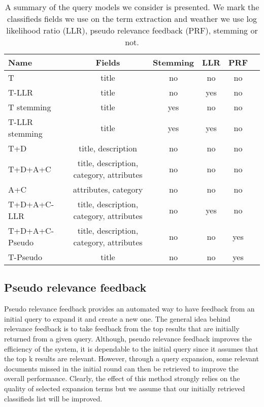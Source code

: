 \begin{table}[H]
\begin{center}
\scriptsize
\caption{A summary of the query models we consider is presented. We mark the classifieds fields we use on the term extraction and weather we use log likelihood ratio (LLR), pseudo relevance feedback (PRF), stemming or not.}
\label{table:QueryFields}
\begin{tabular}{lccccr}
\midrule
Name & Fields & Stemming & LLR & PRF \\
\midrule
T & title & no & no & no \\
T-LLR & title & no & yes & no \\
T stemming & title & yes & no & no \\
T-LLR stemming & title & yes & yes & no \\
T+D  & title, description & no & no & no \\
T+D+A+C & title, description, category, attributes & no & no & no \\
A+C & attributes, category & no & no & no \\
T+D+A+C-LLR & title, description, category, attributes & no & yes & no \\
T+D+A+C-Pseudo & title, description, category, attributes & no & no & yes \\
T-Pseudo & title & no & no & yes\\
\bottomrule
\end{tabular}
\end{center}
\end{table}

\subsection{Pseudo relevance feedback}

Pseudo relevance feedback provides an automated way to have feedback from an initial query to expand it and create a new one. The general idea behind relevance feedback is to take feedback from the top results that are initially returned from a given query. Although, pseudo relevance feedback improves the efficiency of the system, it is dependable to the initial query since it assumes that the top k results are relevant. However, through a query expansion, some relevant documents missed in the initial round can then be retrieved to improve the overall performance. Clearly, the effect of this method strongly relies on the quality of selected expansion terms but we assume that our initially retrieved classifieds list will be improved. 

